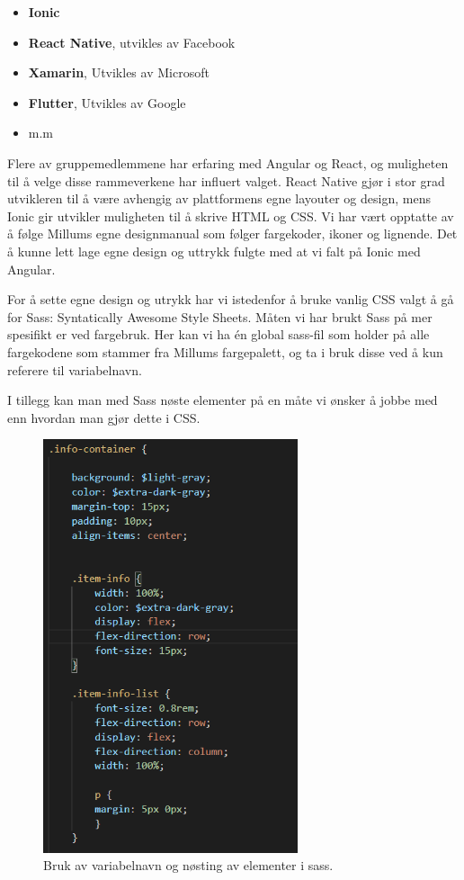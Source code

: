 \begin{itemize}
  \item \textbf{Ionic}
  \item \textbf{React Native}, utvikles av Facebook
  \item \textbf{Xamarin}, Utvikles av Microsoft
  \item \textbf{Flutter}, Utvikles av Google
  \item m.m
\end{itemize}

Flere av gruppemedlemmene har erfaring med Angular og React, og muligheten til å velge disse rammeverkene har influert valget. React Native gjør i stor grad utvikleren til å være avhengig av plattformens egne layouter og design, mens Ionic gir utvikler muligheten til å skrive HTML og CSS. Vi har vært opptatte av å følge Millums egne designmanual som følger fargekoder, ikoner og lignende. Det å kunne lett lage egne design og uttrykk fulgte med at vi falt på Ionic med Angular.

For å sette egne design og utrykk har vi istedenfor å bruke vanlig CSS valgt å gå for Sass: Syntatically Awesome Style Sheets. Måten vi har brukt Sass på mer spesifikt er ved fargebruk. Her kan vi ha én global sass-fil som holder på alle fargekodene som stammer fra Millums fargepalett, og ta i bruk disse ved å kun referere til variabelnavn. 

I tillegg kan man med Sass nøste elementer på en måte vi ønsker å jobbe med enn hvordan man gjør dette i CSS.

\begin{figure}[H]
    \centering
    \includegraphics[width=75mm]{figures/Tekniske-valg/scssExample.PNG}
    \caption{Bruk av variabelnavn og nøsting av elementer i sass.}
\end{figure}
 
